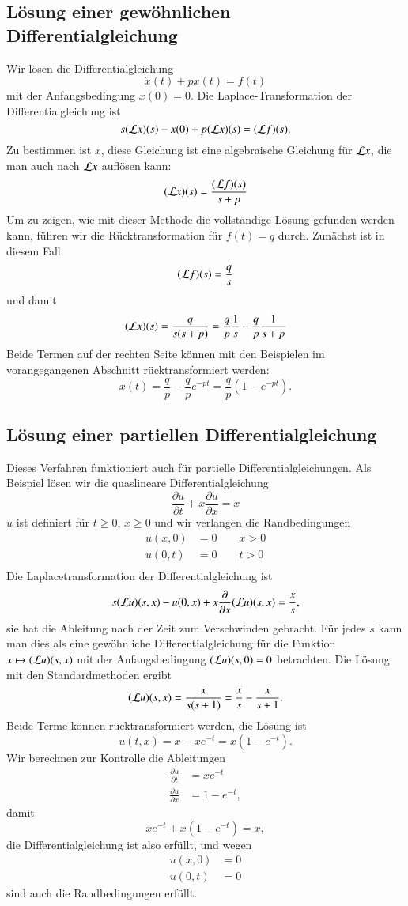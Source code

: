 \subsection{Lösung einer gewöhnlichen Differentialgleichung}
Wir lösen die Differentialgleichung
\[
\dot x(t)+px(t)=f(t)
\]
mit der Anfangsbedingung $x(0)=0$.
Die Laplace-Transformation der Differentialgleichung ist
\[
s({\cal L}x)(s)-x(0)+p({\cal L}x)(s)=({\cal L}f)(s).
\]
Zu bestimmen ist $x$, diese Gleichung ist eine algebraische Gleichung
für ${\cal L}x$, die man auch nach ${\cal L}x$ auflösen kann:
\[
({\cal L}x)(s)
=
\frac{({\cal L}f)(s)}{s+p}
\]
Um zu zeigen, wie mit dieser Methode die vollständige Lösung gefunden
werden kann, führen wir die Rücktransformation für $f(t)=q$ durch.
Zunächst ist in diesem Fall
\[
({\cal L}f)(s)=\frac{q}{s}
\]
und damit 
\[
({\cal L}x)(s)
=
\frac{q}{s(s+p)}=\frac{q}{p}\frac{1}{s}-\frac{q}{p}\frac{1}{s+p}
\]
Beide Termen auf der rechten Seite können mit den Beispielen im vorangegangenen
Abschnitt rücktransformiert werden:
\[
x(t)=\frac{q}{p}-\frac{q}{p}e^{-pt}=\frac{q}{p}(1-e^{-pt}).
\]

\subsection{Lösung einer partiellen Differentialgleichung}
Dieses Verfahren funktioniert auch für partielle Differentialgleichungen.
Als Beispiel lösen wir die quaslineare Differentialgleichung
\[
\frac{\partial u}{\partial t}+x\frac{\partial u}{\partial x}=x
\]
$u$ ist definiert für $t\ge0$, $x\ge 0$ und wir verlangen die Randbedingungen
\begin{align*}
u(x,0)&=0\qquad x>0\\
u(0,t)&=0\qquad t>0\\
\end{align*}
Die Laplacetransformation der Differentialgleichung ist
\[
s({\cal L}u)(s,x)-u(0,x)+x\frac{\partial}{\partial x}({\cal L}u)(s,x)=\frac{x}{s},
\]
sie hat die Ableitung nach der Zeit zum Verschwinden gebracht. Für jedes
$s$ kann man dies als eine gewöhnliche Differentialgleichung für die
Funktion $x\mapsto ({\cal L}u)(s,x)$ mit der Anfangsbedingung
$({\cal L}u)(s,0)=0$ betrachten.
Die Lösung mit den Standardmethoden 
ergibt
\[
({\cal L}u)(s,x)=\frac{x}{s(s+1)}=\frac{x}{s}-\frac{x}{s+1}.
\]
Beide Terme können rücktransformiert werden, die Lösung ist
\[
u(t,x)=x-xe^{-t}=x(1-e^{-t}).
\]
Wir berechnen zur Kontrolle die Ableitungen
\begin{align*}
\frac{\partial u}{\partial t}
&=
xe^{-t}
\\
\frac{\partial u}{\partial x}
&=
1-e^{-t},
\end{align*}
damit 
\[
xe^{-t}+x(1-e^{-t})=x,
\]
die Differentialgleichung ist also erfüllt, und wegen
\begin{align*}
u(x,0)
&=
0
\\
u(0,t)
&=
0
\end{align*}
sind auch die Randbedingungen erfüllt.

